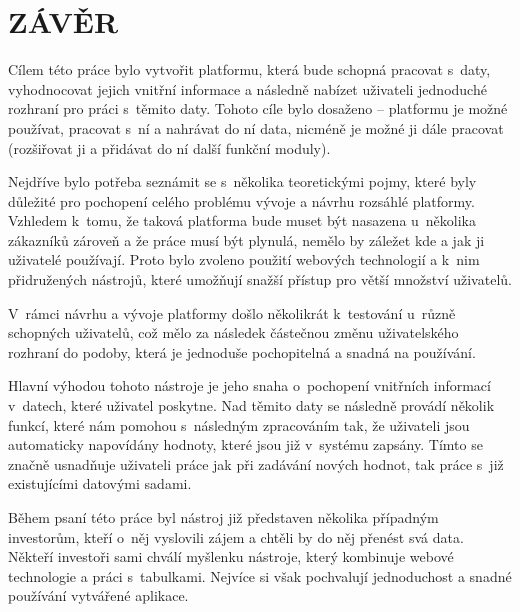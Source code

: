 \chapter*{ZÁVĚR}
\par Cílem této práce bylo vytvořit platformu, která bude schopná pracovat s~daty, vyhodnocovat jejich vnitřní informace a následně nabízet uživateli jednoduché rozhraní pro práci s~těmito daty. Tohoto cíle bylo dosaženo -- platformu je možné používat, pracovat s~ní a nahrávat do ní data, nicméně je možné ji dále pracovat (rozšiřovat ji a přidávat do ní další funkční moduly).

\par Nejdříve bylo potřeba seznámit se s~několika teoretickými pojmy, které byly důležité pro pochopení celého problému vývoje a návrhu rozsáhlé platformy. Vzhledem k~tomu, že taková platforma bude muset být nasazena u~několika zákazníků zároveň a že práce musí být plynulá, nemělo by záležet kde a jak ji uživatelé používají. Proto bylo zvoleno použití webových technologií a k~nim přidružených nástrojů, které umožňují snažší přístup pro větší množství uživatelů.

\par V~rámci návrhu a vývoje platformy došlo několikrát k~testování u~různě schopných uživatelů, což mělo za následek částečnou změnu uživatelského rozhraní do podoby, která je  jednoduše pochopitelná a snadná na používání.

\par Hlavní výhodou tohoto nástroje je jeho snaha o~pochopení vnitřních informací v~datech, které uživatel poskytne. Nad těmito daty se následně provádí několik funkcí, které nám pomohou s~následným zpracováním tak, že uživateli jsou automaticky napovídány hodnoty, které jsou již v~systému zapsány. Tímto se značně usnadňuje uživateli práce jak při zadávání nových hodnot, tak práce s~již existujícími datovými sadami.

\par Během psaní této práce byl nástroj již představen několika případným investorům, kteří o~něj vyslovili zájem a chtěli by do něj přenést svá data. Někteří investoři sami chválí myšlenku nástroje, který kombinuje webové technologie a práci s~tabulkami. Nejvíce si však pochvalují jednoduchost a snadné používání vytvářené aplikace.